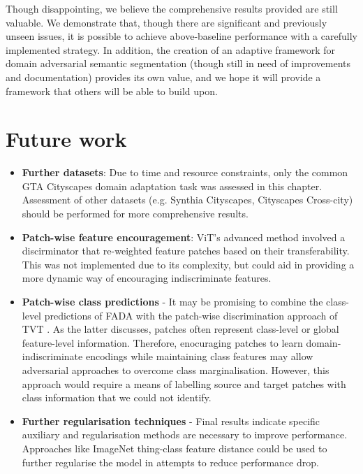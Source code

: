 \documentclass[a4paper,12pt]{report}
\begin{document}
Though disappointing, we believe the comprehensive results provided are still valuable. We demonstrate that, though there are significant and previously unseen issues, it is possible to achieve above-baseline performance with a carefully implemented strategy. In addition, the creation of an adaptive framework for domain adversarial semantic segmentation (though still in need of improvements and documentation) provides its own value, and we hope it will provide a framework that others will be able to build upon.

\section{Future work}
\begin{itemize}
    \item \textbf{Further datasets}: Due to time and resource constraints, only the common GTA \textrightarrow Cityscapes domain adaptation task was assessed in this chapter. Assessment of other datasets (e.g. Synthia \textrightarrow Cityscapes, Cityscapes \textrightarrow Cross-city) should be performed for more comprehensive results.
    \item \textbf{Patch-wise feature encouragement}: ViT's advanced method involved a discirminator that re-weighted feature patches based on their transferability. This was not implemented due to its complexity, but could aid in providing a more dynamic way of encouraging indiscriminate features.
    \item \textbf{Patch-wise class predictions} - It may be promising to combine the class-level predictions of FADA \cite{wang_classes_2020} with the patch-wise discrimination approach of TVT \cite{yang_tvt_2021}. As the latter discusses, patches often represent class-level or global feature-level information. Therefore, enocuraging patches to learn domain-indiscriminate encodings while maintaining class features may allow adversarial approaches to overcome class marginalisation. However, this approach would require a means of labelling source and target patches with class information that we could not identify.
    \item \textbf{Further regularisation techniques} - Final results indicate specific auxiliary and regularisation methods are necessary to improve performance. Approaches like ImageNet thing-class feature distance \cite{hoyer_daformer_2022} could be used to further regularise the model in attempts to reduce performance drop.
\end{itemize}
\end{document}
